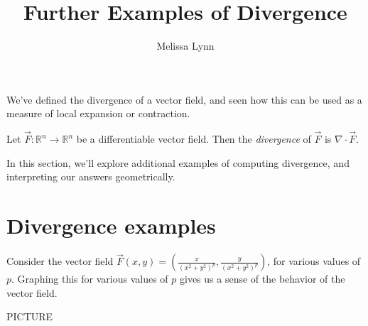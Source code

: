 \documentclass{ximera}
\title{Further Examples of Divergence}
\author{Melissa Lynn}
\begin{document}
  
\begin{abstract}  
\end{abstract}  
\maketitle  

We've defined the divergence of a vector field, and seen how this can be used as a measure of local expansion or contraction.

\begin{definition}
Let $\vec{F}:\mathbb{R}^n\rightarrow\mathbb{R}^n$ be a differentiable vector field. Then the \emph{divergence} of $\vec{F}$ is $\nabla\cdot \vec{F}$.
\end{definition}

In this section, we'll explore additional examples of computing divergence, and interpreting our answers geometrically.

\section*{Divergence examples}

Consider the vector field $\vec{F}(x,y) = \left(\frac{x}{(x^2+y^2)^p},\frac{y}{(x^2+y^2)^p} \right)$, for various values of $p$. Graphing this for various values of $p$ gives us a sense of the behavior of the vector field.

PICTURE
\end{document}
